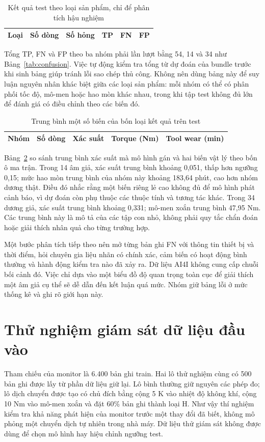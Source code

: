 \begin{table}[H]\centering\caption{Kết quả test theo loại sản phẩm, chỉ để phân tích hậu nghiệm}\label{tab:subgroup}
\begin{tabular}{lrrrrr}\toprule Loại & Số dòng & Số hỏng & TP & FN & FP\\\midrule

\end{tabular}\end{table}

Tổng TP, FN và FP theo ba nhóm phải lần lượt bằng 54, 14 và 34 như Bảng~\ref{tab:confusion}. Việc tự động kiểm tra tổng từ dự đoán của bundle trước khi sinh bảng giúp tránh lỗi sao chép thủ công. Không nên dùng bảng này để suy luận nguyên nhân khác biệt giữa các loại sản phẩm: mỗi nhóm có thể có phân phối tốc độ, mô-men hoặc hao mòn khác nhau, trong khi tập test không đủ lớn để đánh giá có điều chỉnh theo các biến đó.

\begin{table}[H]\centering\caption{Trung bình một số biến của bốn loại kết quả trên test}\label{tab:error-profiles}
\begin{tabular}{lrrrr}\toprule Nhóm & Số dòng & Xác suất & Torque (Nm) & Tool wear (min)\\\midrule

\end{tabular}\end{table}

Bảng~\ref{tab:error-profiles} so sánh trung bình xác suất mà mô hình gán và hai biến vật lý theo bốn ô ma trận. Trong 14 âm giả, xác suất trung bình khoảng 0,051, thấp hơn ngưỡng 0,15; mức hao mòn trung bình của nhóm này khoảng 183,64 phút, cao hơn nhóm dương thật. Điều đó nhắc rằng một biến riêng lẻ cao không đủ để mô hình phát cảnh báo, vì dự đoán còn phụ thuộc các thuộc tính và tương tác khác. Trong 34 dương giả, xác suất trung bình khoảng 0,331; mô-men xoắn trung bình 47,95 Nm. Các trung bình này là mô tả của các tập con nhỏ, không phải quy tắc chẩn đoán hoặc giải thích nhân quả cho từng trường hợp.

Một bước phân tích tiếp theo nên mở từng bản ghi FN với thông tin thiết bị và thời điểm, hỏi chuyên gia liệu nhãn có chính xác, cảm biến có hoạt động bình thường và hành động kiểm tra nào đã xảy ra. Dữ liệu AI4I không cung cấp chuỗi bối cảnh đó. Việc chỉ dựa vào một biểu đồ độ quan trọng toàn cục để giải thích một âm giả cụ thể sẽ dễ dẫn đến kết luận quá mức. Nhóm giữ bảng lỗi ở mức thống kê và ghi rõ giới hạn này.

\section{Thử nghiệm giám sát dữ liệu đầu vào}
Tham chiếu của monitor là 6.400 bản ghi train. Hai lô thử nghiệm cùng có 500 bản ghi được lấy từ phần dữ liệu giữ lại. Lô bình thường giữ nguyên các phép đo; lô dịch chuyển được tạo có chủ đích bằng cộng 5 K vào nhiệt độ không khí, cộng 10 Nm vào mô-men xoắn và đặt 60\% bản ghi thành loại H. Như vậy thí nghiệm kiểm tra khả năng phát hiện của monitor trước một thay đổi đã biết, không mô phỏng một chuyển dịch tự nhiên trong nhà máy. Dữ liệu thử giám sát không được dùng để chọn mô hình hay hiệu chỉnh ngưỡng test.

